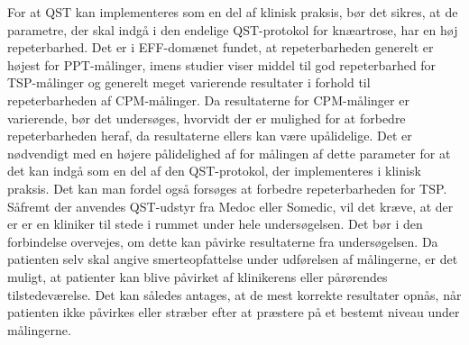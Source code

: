 For at QST kan implementeres som en del af klinisk praksis, bør det sikres, at de parametre, der skal indgå i den endelige QST-protokol for knæartrose, har en høj repeterbarhed. Det er i EFF-domænet fundet, at repeterbarheden generelt er højest for PPT-målinger, imens studier viser middel til god repeterbarhed for TSP-målinger og generelt meget varierende resultater i forhold til repeterbarheden af CPM-målinger. Da resultaterne for CPM-målinger er varierende, bør det undersøges, hvorvidt der er mulighed for at forbedre repeterbarheden heraf, da resultaterne ellers kan være upålidelige. Det er nødvendigt med en højere pålidelighed af for målingen af dette parameter for at det kan indgå som en del af den QST-protokol, der implementeres i klinisk praksis. Det kan man fordel også forsøges at forbedre repeterbarheden for TSP.\\ 
Såfremt der anvendes QST-udstyr fra Medoc eller Somedic, vil det kræve, at der er er en kliniker til stede i rummet under hele undersøgelsen. Det bør i den forbindelse overvejes, om dette kan påvirke resultaterne fra undersøgelsen. Da patienten selv skal angive smerteopfattelse under udførelsen af målingerne, er det muligt, at patienter kan blive påvirket af klinikerens eller pårørendes tilstedeværelse. Det kan således antages, at de mest korrekte resultater opnås, når patienten ikke påvirkes eller stræber efter at præstere på et bestemt niveau under målingerne.


